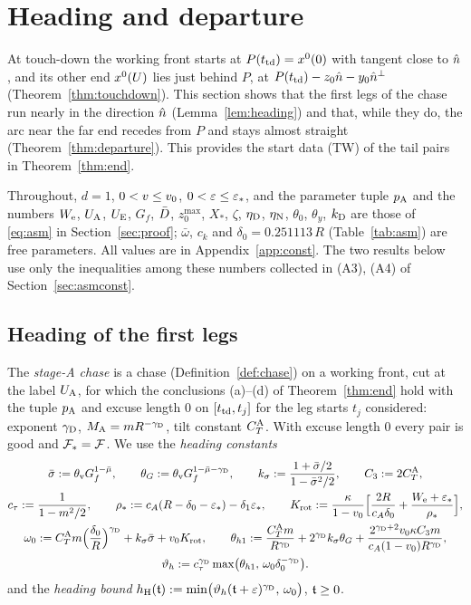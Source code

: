 \section{Heading and departure}\label{sec:dep}

At touch-down the working front starts at $P(t_{\mathrm{td}})=x^0(0)$ with tangent close to $\hat n$, and its other end $x^0(U)$ lies just
behind $P$, at $P(t_{\mathrm{td}})-z_0\hat n-y_0\hat n^\perp$ (Theorem~\ref{thm:touchdown}). This section shows that the first legs of the
chase run nearly in the direction $\hat n$ (Lemma~\ref{lem:heading}) and that, while they do, the arc near the far end recedes from
$P$ and stays almost straight (Theorem~\ref{thm:departure}). This provides the start data (TW) of the tail pairs in
Theorem~\ref{thm:end}.

Throughout, $d=1$, $0<v\le v_0$, $0<\varepsilon\le\varepsilon_*$, and the parameter tuple $p_{\mathrm A}$ and the numbers $W_{\mathrm e}$, $U_{\mathrm A}$, $U_{\mathrm E}$, $G_f$,
$\bar D$, $z_0^{\max}$, $X_*$, $\zeta$, $\eta_{\mathrm D}$, $\eta_{\mathrm N}$, $\theta_0$, $\theta_y$, $k_{\mathrm D}$ are those of \eqref{eq:asm} in
Section~\ref{sec:proof}; $\bar\omega$, $c_k$ and $\delta_0=0.251113\,R$ (Table~\ref{tab:asm}) are free parameters. All values are in Appendix~\ref{app:const}. The two
results below use only the inequalities among these numbers collected in (A3), (A4) of Section~\ref{sec:asmconst}.

\subsection{Heading of the first legs}

The \emph{stage-A chase} is a chase (Definition~\ref{def:chase}) on a working front, cut at the label $U_{\mathrm A}$, for which the
conclusions (a)--(d) of Theorem~\ref{thm:end} hold with the tuple $p_{\mathrm A}$ and excuse length $0$ on $[t_{\mathrm{td}},t_j]$ for the leg starts
$t_j$ considered: exponent $\gamma_{\mathrm D}$, $M_{\mathrm A}=mR^{-\gamma_{\mathrm D}}$, tilt constant $C_T^{\mathrm A}$. With excuse
length $0$ every pair is good and $\mathcal F_*=\mathcal F$. We use the \emph{heading constants}
\begin{equation}\label{eq:dep-headconst}
\begin{gathered}
\bar\sigma:=\theta_{\mathrm v}G_f^{1-\bar\mu},\qquad\theta_G:=\theta_{\mathrm v}G_f^{1-\bar\mu-\gamma_{\mathrm D}},\qquad k_\sigma:=\frac{1+\bar\sigma/2}{1-\bar\sigma^2/2},\qquad
C_3:=2C_T^{\mathrm A},\\
c_\tau:=\frac1{1-m^2/2},\qquad\rho_*:=c_A(R-\delta_0-\varepsilon_*)-\delta_1\varepsilon_*,\qquad
K_{\mathrm{rot}}:=\frac{\kappa}{1-v_0}\Bigl[\frac{2R}{c_A\delta_0}+\frac{W_{\mathrm e}+\varepsilon_*}{\rho_*}\Bigr],\\
\omega_0:=C_T^{\mathrm A}m\Bigl(\frac{\delta_0}R\Bigr)^{\gamma_{\mathrm D}}+k_\sigma\bar\sigma+v_0 K_{\mathrm{rot}},\qquad
\theta_{h1}:=\frac{C_T^{\mathrm A}m}{R^{\gamma_{\mathrm D}}}+2^{\gamma_{\mathrm D}}k_\sigma\theta_G+\frac{2^{\gamma_{\mathrm D}+2}v_0\kappa C_3m}{c_A(1-v_0)R^{\gamma_{\mathrm D}}},\\
\vartheta_h:=c_\tau^{\gamma_{\mathrm D}}\max\bigl(\theta_{h1},\,\omega_0\delta_0^{-\gamma_{\mathrm D}}\bigr).
\end{gathered}
\end{equation}
and the \emph{heading bound} $h_{\mathrm H}(\mathfrak t):=\min\bigl(\vartheta_h(\mathfrak t+\varepsilon)^{\gamma_{\mathrm D}},\,\omega_0\bigr)$, $\mathfrak t\ge0$.

